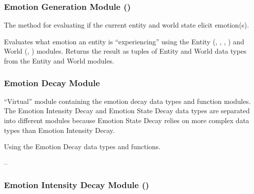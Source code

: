 \subsubsection{Emotion Generation Module ()}

\begin{description}[font=\scshape]
    \item[Secrets:] The method for evaluating if the current entity and world
    state elicit emotion(s).

    \item[Services:] Evaluates what emotion an entity is ``experiencing'' using
    the Entity (, , , )
    and World (, ) modules. Returns the result as
    tuples of Entity and World data types from the Entity and World modules.

    \item[Implemented By:] \progname{}
\end{description}

\subsubsection{Emotion Decay Module}

\begin{description}[font=\scshape]
    \item[Secrets:] ``Virtual'' module containing the emotion decay data types
    and function modules. The Emotion Intensity Decay and Emotion State Decay
    data types are separated into different modules because Emotion State Decay
    relies on more complex data types than Emotion Intensity Decay.

    \item[Services:] Using the Emotion Decay data types and functions.

    \item[Implemented By:] --
\end{description}

\subsubsection{Emotion Intensity Decay Module ()}


